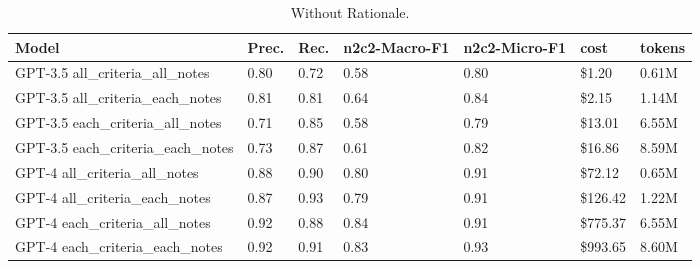 \begin{table}
\caption{Without Rationale.}
\label{tab:ablation_rationale}
\begin{tabular}{lllllll}
\toprule
Model & Prec. & Rec. & n2c2-Macro-F1 & n2c2-Micro-F1 & cost & tokens \\
\midrule
GPT-3.5 all_criteria_all_notes & 0.80 & 0.72 & 0.58 & 0.80 & \$1.20 & 0.61M \\
GPT-3.5 all_criteria_each_notes & 0.81 & 0.81 & 0.64 & 0.84 & \$2.15 & 1.14M \\
GPT-3.5 each_criteria_all_notes & 0.71 & 0.85 & 0.58 & 0.79 & \$13.01 & 6.55M \\
GPT-3.5 each_criteria_each_notes & 0.73 & 0.87 & 0.61 & 0.82 & \$16.86 & 8.59M \\
GPT-4 all_criteria_all_notes & 0.88 & 0.90 & 0.80 & 0.91 & \$72.12 & 0.65M \\
GPT-4 all_criteria_each_notes & 0.87 & 0.93 & 0.79 & 0.91 & \$126.42 & 1.22M \\
GPT-4 each_criteria_all_notes & 0.92 & 0.88 & 0.84 & 0.91 & \$775.37 & 6.55M \\
GPT-4 each_criteria_each_notes & 0.92 & 0.91 & 0.83 & 0.93 & \$993.65 & 8.60M \\
\bottomrule
\end{tabular}
\end{table}
